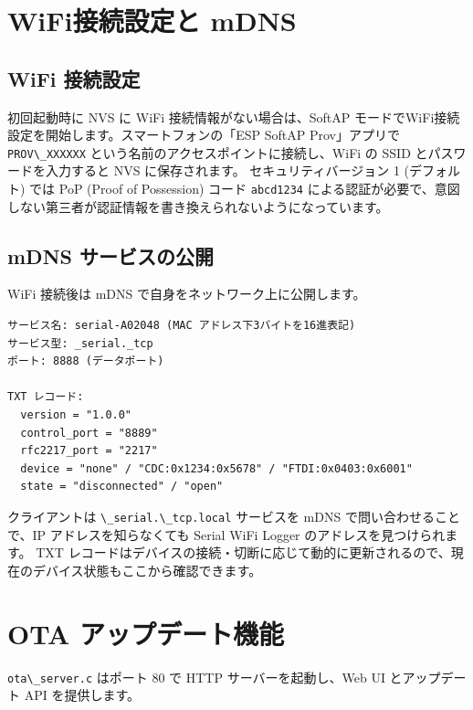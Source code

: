 \documentclass[10pt,twoside,openany,a4j]{ltjsbook}
\newcommand{\passthrough}[1]{#1}
\begin{document}
\chapter{WiFi接続設定と
mDNS}\label{wifiux63a5ux7d9aux8a2dux5b9aux3068-mdns}

\section{WiFi 接続設定}\label{wifi-ux63a5ux7d9aux8a2dux5b9a}

初回起動時に NVS に WiFi 接続情報がない場合は、SoftAP
モードでWiFi接続設定を開始します。スマートフォンの「ESP SoftAP
Prov」アプリで \passthrough{\lstinline!PROV\_XXXXXX!}
という名前のアクセスポイントに接続し、WiFi の SSID
とパスワードを入力すると NVS に保存されます。 セキュリティバージョン 1
(デフォルト) では PoP (Proof of Possession) コード
\passthrough{\lstinline!abcd1234!}
による認証が必要で、意図しない第三者が認証情報を書き換えられないようになっています。

\section{mDNS
サービスの公開}\label{mdns-ux30b5ux30fcux30d3ux30b9ux306eux516cux958b}

WiFi 接続後は mDNS で自身をネットワーク上に公開します。

\begin{lstlisting}
サービス名: serial-A02048 (MAC アドレス下3バイトを16進表記)
サービス型: _serial._tcp
ポート: 8888 (データポート)

TXT レコード:
  version = "1.0.0"
  control_port = "8889"
  rfc2217_port = "2217"
  device = "none" / "CDC:0x1234:0x5678" / "FTDI:0x0403:0x6001"
  state = "disconnected" / "open"
\end{lstlisting}

クライアントは \passthrough{\lstinline!\_serial.\_tcp.local!} サービスを
mDNS で問い合わせることで、IP アドレスを知らなくても Serial WiFi Logger
のアドレスを見つけられます。 TXT
レコードはデバイスの接続・切断に応じて動的に更新されるので、現在のデバイス状態もここから確認できます。

\chapter{OTA
アップデート機能}\label{ota-ux30a2ux30c3ux30d7ux30c7ux30fcux30c8ux6a5fux80fd}

\passthrough{\lstinline!ota\_server.c!} はポート 80 で HTTP
サーバーを起動し、Web UI とアップデート API を提供します。
\end{document}
